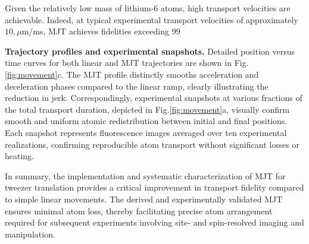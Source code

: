 Given the relatively low mass of lithium-6 atoms, high transport velocities are achievable. Indeed, at typical experimental transport velocities of approximately $10,\mu$m/ms, MJT achieves fidelities exceeding 99%

\textbf{Trajectory profiles and experimental snapshots.}
Detailed position versus time curves for both linear and MJT trajectories are shown in Fig.\ref{fig:movement}c. The MJT profile distinctly smooths acceleration and deceleration phases compared to the linear ramp, clearly illustrating the reduction in jerk. Correspondingly, experimental snapshots at various fractions of the total transport duration, depicted in Fig.\ref{fig:movement}a, visually confirm smooth and uniform atomic redistribution between initial and final positions. Each snapshot represents fluorescence images averaged over ten experimental realizations, confirming reproducible atom transport without significant losses or heating.

In summary, the implementation and systematic characterization of MJT for tweezer translation provides a critical improvement in transport fidelity compared to simple linear movements. The derived and experimentally validated MJT ensures minimal atom loss, thereby facilitating precise atom arrangement required for subsequent experiments involving site- and spin-resolved imaging and manipulation.

